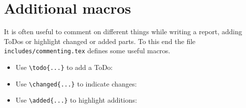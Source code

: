 \section{Additional macros}

It is often useful to comment on different things while writing a report, adding ToDos or highlight changed or added parts. To this end the file \texttt{includes/commenting.tex} defines some useful macros.
\begin{itemize}
    \item Use \verb|\todo{...}| to add a ToDo:\newline {}
    \item Use \verb|\changed{...}| to indicate changes:\newline {}
    \item Use \verb|\added{...}| to highlight additions:\newline {}
\end{itemize}
